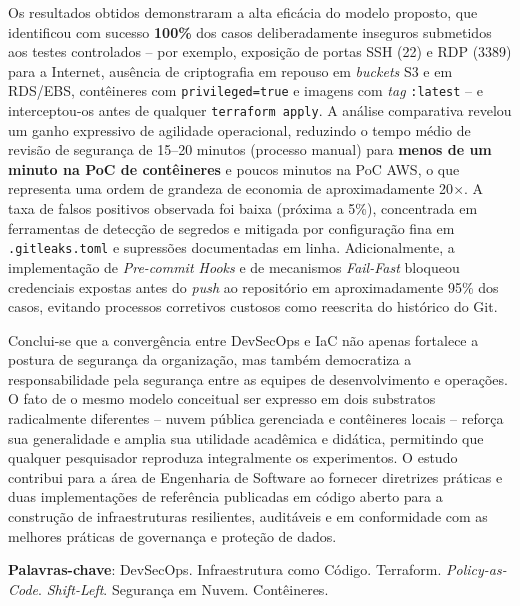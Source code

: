 \begin{resumo}
Os resultados obtidos demonstraram a alta eficácia do modelo proposto, que identificou com sucesso \textbf{100\%} dos casos deliberadamente inseguros submetidos aos testes controlados -- por exemplo, exposição de portas SSH (22) e RDP (3389) para a Internet, ausência de criptografia em repouso em \textit{buckets} S3 e em RDS/EBS, contêineres com \texttt{privileged=true} e imagens com \textit{tag} \texttt{:latest} -- e interceptou-os antes de qualquer \texttt{terraform apply}. A análise comparativa revelou um ganho expressivo de agilidade operacional, reduzindo o tempo médio de revisão de segurança de 15--20 minutos (processo manual) para \textbf{menos de um minuto na PoC de contêineres} e poucos minutos na PoC AWS, o que representa uma ordem de grandeza de economia de aproximadamente 20$\times$. A taxa de falsos positivos observada foi baixa (próxima a 5\%), concentrada em ferramentas de detecção de segredos e mitigada por configuração fina em \texttt{.gitleaks.toml} e supressões documentadas em linha. Adicionalmente, a implementação de \textit{Pre-commit Hooks} e de mecanismos \textit{Fail-Fast} bloqueou credenciais expostas antes do \textit{push} ao repositório em aproximadamente 95\% dos casos, evitando processos corretivos custosos como reescrita do histórico do Git.

Conclui-se que a convergência entre DevSecOps e IaC não apenas fortalece a postura de segurança da organização, mas também democratiza a responsabilidade pela segurança entre as equipes de desenvolvimento e operações. O fato de o mesmo modelo conceitual ser expresso em dois substratos radicalmente diferentes -- nuvem pública gerenciada e contêineres locais -- reforça sua generalidade e amplia sua utilidade acadêmica e didática, permitindo que qualquer pesquisador reproduza integralmente os experimentos. O estudo contribui para a área de Engenharia de Software ao fornecer diretrizes práticas e duas implementações de referência publicadas em código aberto para a construção de infraestruturas resilientes, auditáveis e em conformidade com as melhores práticas de governança e proteção de dados.

 \textbf{Palavras-chave}: DevSecOps. Infraestrutura como Código. Terraform. \textit{Policy-as-Code}. \textit{Shift-Left}. Segurança em Nuvem. Contêineres.
\end{resumo}

\newpage



